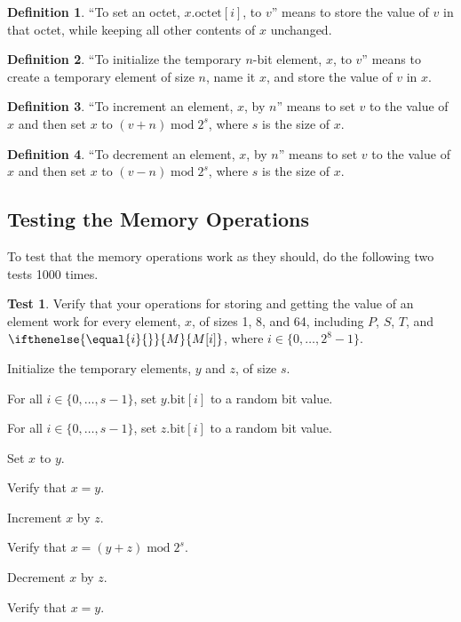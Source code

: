 \documentclass[a4paper,12pt]{article}
\newcommand{\MEM}[1]{\ifthenelse{\equal{#1}{}}{M}{M[#1]}}
\newcommand{\PC}{P}
\newcommand{\SP}{S}
\newcommand{\TERM}{T}
\newcommand{\octno}[2]{#1.\mathrm{octet}[#2]}
\newcommand{\bitno}[2]{#1.\mathrm{bit}[#2]}
\newcommand{\range}[2]{\{#1,\ldots,#2\}}
\DeclareMathOperator{\MOD}{mod}
\newcommand{\modulo}[2]{#1 \MOD #2}
\theoremstyle{definition}
\newtheorem{definition}{Definition}
\newtheorem{test}{Test}
\begin{document}
\begin{definition}
``To set an octet, $\octno{x}{i}$, to $v$'' means to store the value of $v$ in that octet, while keeping all other contents of $x$ unchanged.
\end{definition}

\begin{definition}
``To initialize the temporary $n$-bit element, $x$, to $v$'' means to create a temporary element of size $n$, name it $x$, and store the value of $v$ in $x$.
\end{definition}

\begin{definition}
``To increment an element, $x$, by $n$'' means to set $v$ to the value of $x$ and then set $x$ to $\modulo{(v + n)}{2^s}$, where $s$ is the size of $x$.
\end{definition}

\begin{definition}
``To decrement an element, $x$, by $n$'' means to set $v$ to the value of $x$ and then set $x$ to $\modulo{(v - n)}{2^s}$, where $s$ is the size of $x$.
\end{definition}

\subsection{Testing the Memory Operations}

To test that the memory operations work as they should, do the following two tests 1000 times.

\begin{test}
  Verify that your operations for storing and getting the value of an element work for every element, $x$, of sizes 1, 8, and 64, including $\PC$, $\SP$, $\TERM$, and $\MEM{i}$, where $i \in \range{0}{2^8-1}$.
  \begin{stepnumbers}
  \item Initialize the temporary elements, $y$ and $z$, of size $s$.
  \item For all $i \in \range{0}{s-1}$, set $\bitno{y}{i}$ to a random bit value.
  \item For all $i \in \range{0}{s-1}$, set $\bitno{z}{i}$ to a random bit value.
  \item Set $x$ to $y$.
  \item Verify that $x = y$.
  \item Increment $x$ by $z$.
  \item Verify that $x = \modulo{(y + z)}{2^s}$.
  \item Decrement $x$ by $z$.
  \item Verify that $x = y$.
  \end{stepnumbers}
\end{test}
\end{document}

